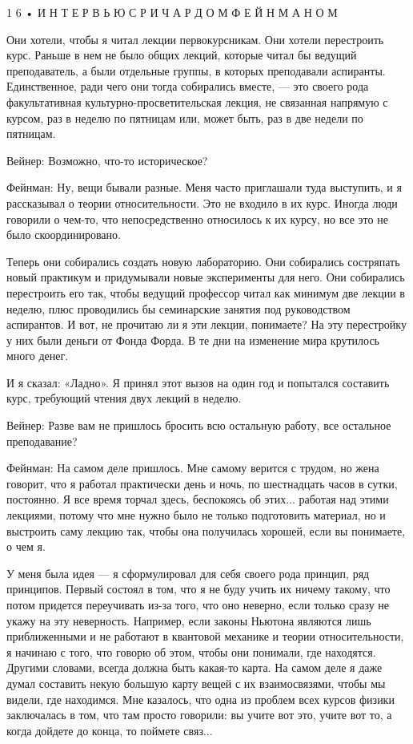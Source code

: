 \documentclass[10pt,oneside]{article}
\begin{document}
1 6 • И Н Т Е Р В Ь Ю  С  Р И Ч А Р Д О М  Ф Е Й Н М А Н О М\par

Они хотели, чтобы я читал лекции первокурсникам. Они хотели перестроить курс. Раньше в нем не было общих лекций, которые читал бы ведущий преподаватель, а были отдельные группы, в которых преподавали аспиранты. Единственное, ради чего они тогда собирались вместе, --- это своего рода факультативная культурно-просветительская лекция, не связанная напрямую с курсом, раз в неделю по пятницам или, может быть, раз в две недели по пятницам.\par

Вейнер: Возможно, что-то историческое?\par

Фейнман: Ну, вещи бывали разные. Меня часто приглашали туда выступить, и я рассказывал о теории относительности. Это не входило в их курс. Иногда люди говорили о чем-то, что непосредственно относилось к их курсу, но все это не было скоординировано.\par

Теперь они собирались создать новую лабораторию. Они собирались состряпать новый практикум и придумывали новые эксперименты для него. Они собирались перестроить его так, чтобы ведущий профессор читал как минимум две лекции в неделю, плюс проводились бы семинарские занятия под руководством аспирантов. И вот, не прочитаю ли я эти лекции, понимаете? На эту перестройку у них были деньги от Фонда Форда. В те дни на изменение мира крутилось много денег.\par

И я сказал: «Ладно». Я принял этот вызов на один год и попытался составить курс, требующий чтения двух лекций в неделю.\par

Вейнер: Разве вам не пришлось бросить всю остальную работу, все остальное преподавание?\par

Фейнман: На самом деле пришлось. Мне самому верится с трудом, но жена говорит, что я работал практически день и ночь, по шестнадцать часов в сутки, постоянно. Я все время торчал здесь, беспокоясь об этих... работая над этими лекциями, потому что мне нужно было не только подготовить материал, но и выстроить саму лекцию так, чтобы она получилась хорошей, если вы понимаете, о чем я.\par

У меня была идея --- я сформулировал для себя своего рода принцип, ряд принципов. Первый состоял в том, что я не буду учить их ничему такому, что потом придется переучивать из-за того, что оно неверно, если только сразу не укажу на эту неверность. Например, если законы Ньютона являются лишь приближенными и не работают в квантовой механике и теории относительности, я начинаю с того, что говорю об этом, чтобы они понимали, где находятся. Другими словами, всегда должна быть какая-то карта. На самом деле я даже думал составить некую большую карту вещей с их взаимосвязями, чтобы мы видели, где находимся. Мне казалось, что одна из проблем всех курсов физики заключалась в том, что там просто говорили: вы учите вот это, учите вот то, а когда дойдете до конца, то поймете связ...\par
\end{document}
